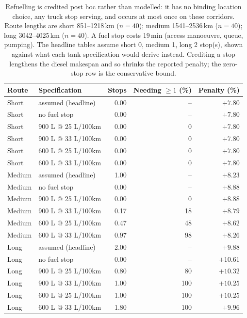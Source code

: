 \begin{table}[ht]\centering
\caption{Refuelling is credited post hoc rather than modelled: it has no binding location choice, any truck stop serving, and occurs at most once on these corridors.  Route lengths are short 851--1218\,km ($n=40$); medium 1541--2536\,km ($n=40$); long 3042--4025\,km ($n=40$).  A fuel stop costs 19\,min (access manoeuvre, queue, pumping).  The headline tables assume short 0, medium 1, long 2 stop(s), shown against what each tank specification would derive instead.  Crediting a stop lengthens the diesel makespan and so shrinks the reported penalty; the zero-stop row is the conservative bound.}
\label{tab:diesel-refuel}
\begin{tabular}{llrrr}
\hline
Route & Specification & Stops & Needing $\geq 1$ (\%) & Penalty (\%) \\
\hline
Short & assumed (headline) & 0.00 & -- & $+7.80$ \\
Short & no fuel stop & 0.00 & -- & $+7.80$ \\
Short & 900 L @ 25 L/100km & 0.00 & 0 & $+7.80$ \\
Short & 900 L @ 33 L/100km & 0.00 & 0 & $+7.80$ \\
Short & 600 L @ 25 L/100km & 0.00 & 0 & $+7.80$ \\
Short & 600 L @ 33 L/100km & 0.00 & 0 & $+7.80$ \\
Medium & assumed (headline) & 1.00 & -- & $+8.23$ \\
Medium & no fuel stop & 0.00 & -- & $+8.88$ \\
Medium & 900 L @ 25 L/100km & 0.00 & 0 & $+8.88$ \\
Medium & 900 L @ 33 L/100km & 0.17 & 18 & $+8.79$ \\
Medium & 600 L @ 25 L/100km & 0.47 & 48 & $+8.62$ \\
Medium & 600 L @ 33 L/100km & 0.97 & 98 & $+8.26$ \\
Long & assumed (headline) & 2.00 & -- & $+9.88$ \\
Long & no fuel stop & 0.00 & -- & $+10.61$ \\
Long & 900 L @ 25 L/100km & 0.80 & 80 & $+10.32$ \\
Long & 900 L @ 33 L/100km & 1.00 & 100 & $+10.25$ \\
Long & 600 L @ 25 L/100km & 1.00 & 100 & $+10.25$ \\
Long & 600 L @ 33 L/100km & 1.80 & 100 & $+9.96$ \\
\hline
\end{tabular}
\end{table}
